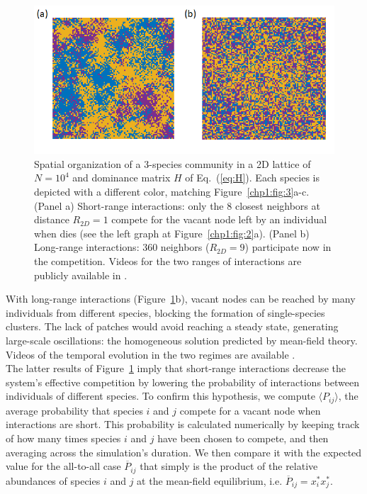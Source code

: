\begin{figure}[t!]
 \centering
  \includegraphics[width=1.0\linewidth]{figures/chp1/fig5.png}
\caption[Spatial organization for different interaction radius]{Spatial organization of a 3-species community in a 2D lattice of $N=10^4$ and dominance matrix $H$ of Eq.~(\ref{eq:H}). Each species is depicted with a different color, matching Figure~\ref{chp1:fig:3}a-c. (Panel a) Short-range interactions: only the $8$ closest neighbors at distance $R_{2D} = 1$ compete for the vacant node left by an individual when dies (see the left graph at Figure~\ref{chp1:fig:2}a). (Panel b) Long-range interactions: $360$ neighbors ($R_{2D} = 9$) participate now in the competition. Videos for the two ranges of interactions are publicly available in \cite{videos}.} \label{chp1:fig:5}
\end{figure}

With long-range interactions (Figure~\ref{chp1:fig:5}b), vacant nodes can be reached by many individuals from different species, blocking the formation of single-species clusters. The lack of patches would avoid reaching a steady state, generating large-scale oscillations: the homogeneous solution predicted by mean-field theory. Videos of the temporal evolution in the two regimes are available \cite{videos}. \\

The latter results of Figure~\ref{chp1:fig:5} imply that short-range interactions decrease the system's effective competition by lowering the probability of interactions between individuals of different species. To confirm this hypothesis, we compute $\langle P_{ij} \rangle$, the average probability that species $i$ and $j$ compete for a vacant node when interactions are short. This probability is calculated numerically by keeping track of how many times species $i$ and $j$ have been chosen to compete, and then averaging across the simulation's duration. We then compare it with the expected value for the all-to-all case $\overline{P}_{ij}$ that simply is the product of the relative abundances of species $i$ and $j$ at the mean-field equilibrium, i.e. $\overline{P}_{ij}=x_i^* x_j^*$.  \\

